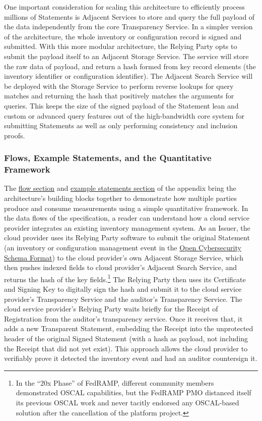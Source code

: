 \documentclass{jdf}
\begin{document}
One important consideration for scaling this architecture to efficiently process millions of Statements is Adjacent Services to store and query the full payload of the data independently from the core Transparency Service. In a simpler version of the architecture, the whole inventory or configuration record is signed and submitted. With this more modular architecture, the Relying Party opts to submit the payload itself to an Adjacent Storage Service. The service will store the raw data of payload, and return a hash formed from key record elements (the inventory identifier or configuration identifier). The Adjacent Search Service will be deployed with the Storage Service to perform reverse lookups for query matches and returning the hash that positively matches the arguments for queries. This keeps the size of the signed payload of the Statement lean and custom or advanced query features out of the high-bandwidth core system for submitting Statements as well as only performing consistency and inclusion proofs.

\subsubsection{Flows, Example Statements, and the Quantitative Framework}

The \href{https://github.com/aj-stein/practicum/pull/1}{flow section} and \href{https://aj-stein.github.io/conmotion/architecture.html#example-statements}{example statements section} of the appendix bring the architecture's building blocks together to demonstrate how multiple parties produce and consume measurements using a simple quantitative framework. In the data flows of the specification, a reader can understand how a cloud service provider integrates an existing inventory management system. As an Issuer, the cloud provider uses its Relying Party software to submit the original Statement (an inventory or configuration management event in the \href{https://schema.ocsf.io/}{Open Cybersecurity Schema Format}) to the cloud provider's own Adjacent Storage Service, which then pushes indexed fields to cloud provider's Adjacent Search Service, and returns the hash of the key fields.\footnote{In the ``20x Phase'' of FedRAMP, different community members demonstrated OSCAL capabilities, but the FedRAMP PMO distanced itself its previous OSCAL work and never tacitly endorsed any OSCAL-based solution after the cancellation of the platform project.} The Relying Party then uses its Certificate and Signing Key to digitally sign the hash and submit it to the cloud service provider's Transparency Service and the auditor's Transparency Service. The cloud service provider's Relying Party waits briefly for the Receipt of Registration from the auditor's transparency service. Once it receives that, it adds a new Transparent Statement, embedding the Receipt into the unprotected header of the original Signed Statement (with a hash as payload, not including the Receipt that did not yet exist). This approach allows the cloud provider to verifiably prove it detected the inventory event and had an auditor countersign it. 
\end{document}
